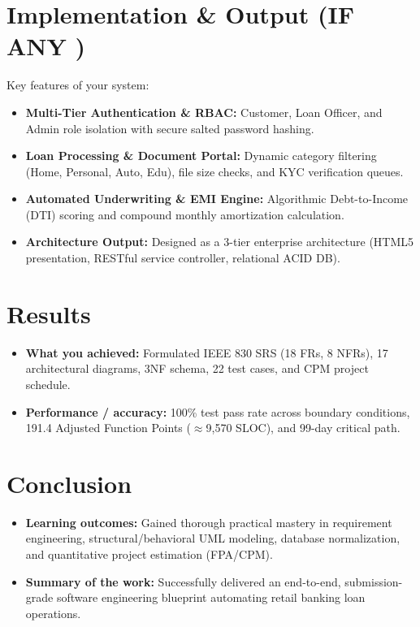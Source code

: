 \documentclass[11pt,a4paper]{article}
\begin{document}
\section*{Implementation \& Output (IF ANY )}
Key features of your system:
\begin{itemize}
    \item \textbf{Multi-Tier Authentication \& RBAC:} Customer, Loan Officer, and Admin role isolation with secure salted password hashing.
    \item \textbf{Loan Processing \& Document Portal:} Dynamic category filtering (Home, Personal, Auto, Edu), file size checks, and KYC verification queues.
    \item \textbf{Automated Underwriting \& EMI Engine:} Algorithmic Debt-to-Income (DTI) scoring and compound monthly amortization calculation.
    \item \textbf{Architecture Output:} Designed as a 3-tier enterprise architecture (HTML5 presentation, RESTful service controller, relational ACID DB).
\end{itemize}

\section*{Results}
\begin{itemize}
    \item \textbf{What you achieved:} Formulated IEEE 830 SRS (18 FRs, 8 NFRs), 17 architectural diagrams, 3NF schema, 22 test cases, and CPM project schedule.
    \item \textbf{Performance / accuracy:} 100\% test pass rate across boundary conditions, 191.4 Adjusted Function Points ($\approx$9,570 SLOC), and 99-day critical path.
\end{itemize}

\newpage


\section*{Conclusion}
\begin{itemize}
    \item \textbf{Learning outcomes:} Gained thorough practical mastery in requirement engineering, structural/behavioral UML modeling, database normalization, and quantitative project estimation (FPA/CPM).
    \item \textbf{Summary of the work:} Successfully delivered an end-to-end, submission-grade software engineering blueprint automating retail banking loan operations.
\end{itemize}
\end{document}
